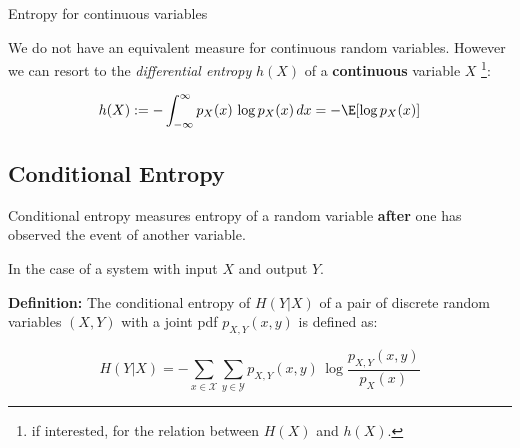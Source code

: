\begin{frame}{Entropy for continuous variables}

We do not have an equivalent measure for continuous random variables. 
However we can resort to the \emph{differential entropy} $h(X)$ of a \textbf{continuous} variable $X$
\footnote{if interested, \citealp[see][Ch~10.2]{haykin1994neural} for the relation between $H(X)$ and $h(X)$.}:

\begin{equation}
\label{eq:entropydiff}
h(X) := - \int_{-\infty}^{\infty} p_X(x)\,\log p_X(x) \, dx 
= - \E \lbrack \log p_X(x) \rbrack
\end{equation}

\end{frame}




\subsection{Conditional Entropy}

\begin{frame}{\subsecname}

Conditional entropy measures entropy of a random variable \textbf{after} one has observed the event of another variable.

\end{frame}

\begin{frame}{\subsecname}

In the case of a system with input $X$ and output $Y$.\\

\svspace{3mm}

\textbf{Definition:} 
The conditional entropy of $H(Y|X)$ of a pair of discrete random variables $(X,Y)$ with a joint pdf $p_{X,Y}(x,y)$ is defined as:

\begin{equation}
\label{eq:entropycond}
H(Y|X) = -\sum_{x \in \mathcal{X}} \sum_{y \in \mathcal{Y}} p_{X,Y}(x,y)\,\log \frac{p_{X,Y}(x,y)}{p_X(x)}
\end{equation}


\end{frame}

